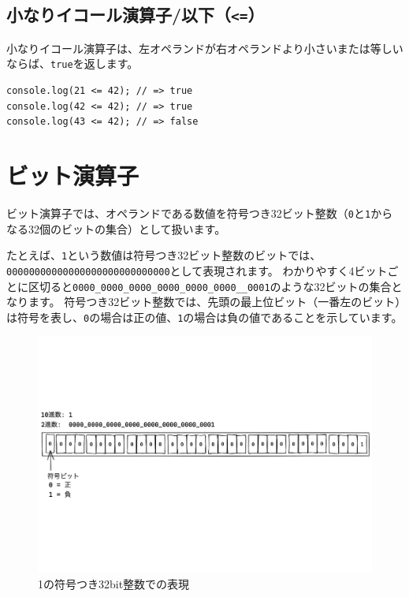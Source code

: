 \hypertarget{less-than-equal}{%
\subsection{\texorpdfstring{小なりイコール演算子/以下（\texttt{\textless{}=}）}{小なりイコール演算子/以下（\textless{}=）}}\label{less-than-equal}}

小なりイコール演算子は、左オペランドが右オペランドより小さいまたは等しいならば、\texttt{true}を返します。

\begin{lstlisting}
console.log(21 <= 42); // => true
console.log(42 <= 42); // => true
console.log(43 <= 42); // => false
\end{lstlisting}

\hypertarget{bit-operator}{%
\section{ビット演算子}\label{bit-operator}}

ビット演算子では、オペランドである数値を符号つき32ビット整数（\texttt{0}と\texttt{1}からなる32個のビットの集合）として扱います。

たとえば、\texttt{1}という数値は符号つき32ビット整数のビットでは、\texttt{00000000000000000000000000000}として表現されます。
わかりやすく4ビットごとに区切ると\texttt{0000\_0000\_0000\_0000\_0000\_0000\_\_0001}のような32ビットの集合となります。
符号つき32ビット整数では、先頭の最上位ビット（一番左のビット）は符号を表し、\texttt{0}の場合は正の値、\texttt{1}の場合は負の値であることを示しています。

\begin{figure}[h]
\centering
\includegraphics[width=130mm]{fig/0001.pdf}
\caption{1の符号つき32bit整数での表現}
\end{figure}


